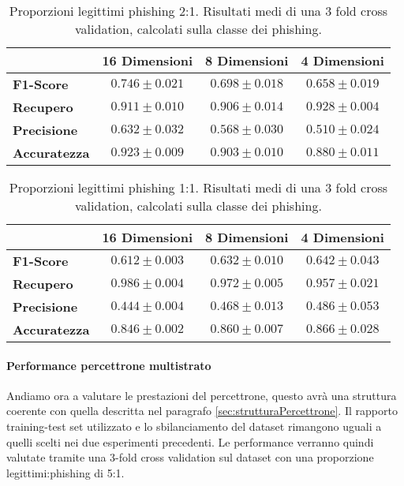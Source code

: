 \documentclass[../../main.tex]{subfiles}
\begin{document}
    \begin{table}[H]
        \centering
        \begin{tabular}{lccc}
            \toprule
            {} &                      \textbf{16 Dimensioni} & \textbf{8 Dimensioni} & \textbf{4 Dimensioni} \\
            \midrule
            \textbf{F1-Score }      &      $0.746 \pm 0.021$ & $0.698 \pm 0.018$ & $0.658 \pm 0.019$\\
            \textbf{Recupero   }    &      $0.911 \pm 0.010$ & $0.906 \pm 0.014$ & $0.928 \pm 0.004$\\
            \textbf{Precisione}     &      $0.632 \pm 0.032$ & $0.568 \pm 0.030$ & $0.510 \pm 0.024$\\
            \textbf{Accuratezza }   &      $0.923 \pm 0.009$ & $0.903 \pm 0.010$ & $0.880 \pm 0.011$\\
            \bottomrule
        \end{tabular}     
        \caption{Proporzioni legittimi phishing 2:1. Risultati medi di una 3 fold cross validation, calcolati sulla classe dei phishing.} 
        \label{tab:2a1Undersampling}  
    \end{table}

    \begin{table}[H]
        \centering
        \begin{tabular}{lccc}
            \toprule
            {} &                      \textbf{16 Dimensioni} & \textbf{8 Dimensioni} & \textbf{4 Dimensioni} \\
            \midrule
            \textbf{F1-Score }      &      $0.612 \pm 0.003$ & $0.632 \pm 0.010$ & $0.642 \pm 0.043$\\
            \textbf{Recupero   }    &      $0.986 \pm 0.004$ & $0.972 \pm 0.005$ & $0.957 \pm 0.021$\\
            \textbf{Precisione}     &      $0.444 \pm 0.004$ & $0.468 \pm 0.013$ & $0.486 \pm 0.053$\\
            \textbf{Accuratezza }   &      $0.846 \pm 0.002$ & $0.860 \pm 0.007$ & $0.866 \pm 0.028$\\
            \bottomrule
        \end{tabular}     
        \caption{Proporzioni legittimi phishing 1:1. Risultati medi di una 3 fold cross validation, calcolati sulla classe dei phishing.}  
        \label{tab:1a1Undersampling} 
    \end{table}

    \paragraph{Performance percettrone multistrato}
    Andiamo ora a valutare le prestazioni del percettrone, questo avrà una struttura coerente con quella descritta nel paragrafo \ref{sec:strutturaPercettrone}. Il rapporto training-test set utilizzato e lo sbilanciamento del dataset rimangono uguali a quelli scelti nei due esperimenti precedenti. Le performance verranno quindi valutate tramite una 3-fold cross validation sul dataset con una proporzione legittimi:phishing di 5:1.
\end{document}
